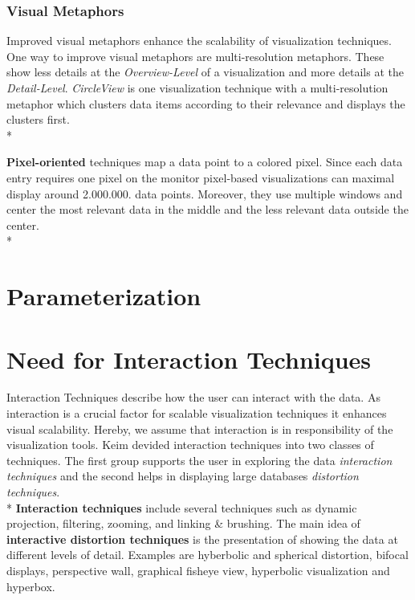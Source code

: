 \subsubsection*{Visual Metaphors}
Improved visual metaphors enhance the scalability of visualization techniques\cite{Eick2002}.  One way to improve visual metaphors are multi-resolution metaphors\cite{Keim2005}. These show less details at the \textit{Overview-Level} of a visualization and more details at the \textit{Detail-Level}. \textit{CircleView} is one visualization technique with a multi-resolution metaphor which clusters data items according to their relevance and displays the clusters first.
\\*

\textbf{Pixel-oriented} techniques map a data point to a colored pixel. Since each data entry requires one pixel on the monitor pixel-based visualizations can maximal display around 2.000.000. data points. Moreover, they use multiple windows and center the most relevant data in the middle and the less relevant data outside the center\cite{Keim1996}.\\*


\section{Parameterization}

\section{Need for Interaction Techniques}
Interaction Techniques describe how the user can interact with the data. As interaction is a crucial factor for scalable visualization techniques it enhances visual scalability\cite{tegarden1999}. 
Hereby, we assume that interaction is in responsibility of the visualization tools. Keim\cite{2002} devided interaction techniques into two classes of techniques. The first group supports the user in exploring the data \textit{interaction techniques} and the second helps in displaying large databases \textit{distortion techniques}. \\*
\textbf{Interaction techniques} include several techniques such as dynamic projection, filtering, zooming, and linking \& brushing.
The main idea of \textbf{interactive distortion techniques} is the presentation of showing the data at different levels of detail. Examples are hyberbolic and spherical distortion, bifocal displays, perspective wall, graphical fisheye view, hyperbolic visualization and hyperbox\cite{Keim2002}. 

